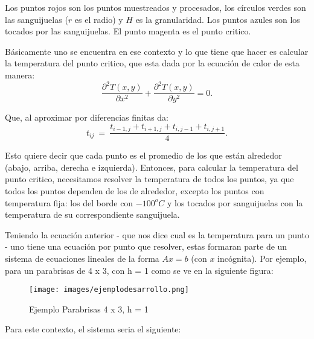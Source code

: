 \documentclass[a4paper]{article}
\begin{document}
Los puntos rojos son los puntos muestreados y procesados, los círculos verdes son las sanguijuelas ($r$ es el radio) y $H$ es la granularidad. Los puntos azules son los tocados por las sanguijuelas. El punto magenta es el punto critico.

Básicamente uno se encuentra en ese contexto y lo que tiene que hacer es calcular la temperatura del punto critico, que esta dada por la ecuación de calor de esta manera: 
\begin{equation}\label{eq:calor}
\frac{\partial^2T(x,y)}{\partial x^{2}}+\frac{\partial^2 T(x,y)}{\partial y^{2}} = 0.
\end{equation}

Que, al aproximar por diferencias finitas da:
\begin{equation}
t_{ij} \ =\ \frac{ t_{i-1,j} + t_{i+1,j} + t_{i,j-1} + t_{i,j+1}}{4}.\label{eq:calordd}
\end{equation}

Esto quiere decir que cada punto es el promedio de los que están alrededor (abajo, arriba, derecha e izquierda). Entonces, para calcular la temperatura del punto critico, necesitamos resolver la temperatura de todos los puntos, ya que todos los puntos dependen de los de alrededor, excepto los puntos con temperatura fija: los del borde con $-100^oC$ y los tocados por sanguijuelas con la temperatura de su correspondiente sanguijuela.

Teniendo la ecuación anterior - que nos dice cual es la temperatura para un punto - uno tiene una ecuación por punto que resolver, estas formaran parte de un sistema de ecuaciones lineales de la forma $Ax=b$ (con $x$ incógnita). Por ejemplo, para un parabrisas de 4 x 3, con h = 1 como se ve en la siguiente figura:

\begin{figure}[H]
\centering
\texttt{[image: images/ejemplodesarrollo.png]}
\caption{Ejemplo Parabrisas 4 x 3, h = 1}
\label{parabrisasejemplo}
\end{figure}

Para este contexto, el sistema seria el siguiente:
\end{document}
